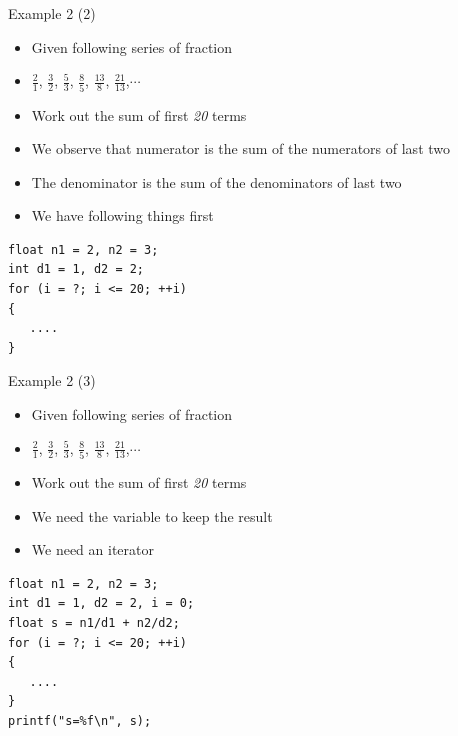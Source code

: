 \begin{frame}[fragile]{Example 2 (2)}
\begin{itemize}
	\item {Given following series of fraction}
	\item {$\frac{2}{1}$, $\frac{3}{2}$, $\frac{5}{3}$, $\frac{8}{5}$, $\frac{13}{8}$, $\frac{21}{13}$,$\cdots$}
	\item {Work out the sum of first \textit{20} terms}
\end{itemize}

\begin{itemize}
	\item {We observe that numerator is the sum of the numerators of last two}
	\item {The denominator is the sum of the denominators of last two}
	\item {We have following things first}
\end{itemize}
\begin{lstlisting}[linewidth=0.7\linewidth]
float n1 = 2, n2 = 3;
int d1 = 1, d2 = 2;
for (i = ?; i <= 20; ++i)
{
   ....
}
\end{lstlisting}
\end{frame}

\begin{frame}[fragile]{Example 2 (3)}
\begin{itemize}
	\item {Given following series of fraction}
	\item {$\frac{2}{1}$, $\frac{3}{2}$, $\frac{5}{3}$, $\frac{8}{5}$, $\frac{13}{8}$, $\frac{21}{13}$,$\cdots$}
	\item {Work out the sum of first \textit{20} terms}
\end{itemize}

\begin{itemize}
	\item {We need the variable to keep the result}
	\item {We need an iterator}
\end{itemize}
\begin{lstlisting}[linewidth=0.7\linewidth]
float n1 = 2, n2 = 3;
int d1 = 1, d2 = 2, i = 0;
float s = n1/d1 + n2/d2;
for (i = ?; i <= 20; ++i)
{
   ....
}
printf("s=%f\n", s);
\end{lstlisting}
\end{frame}

